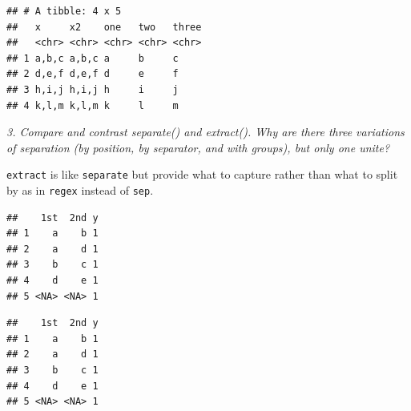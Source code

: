 \documentclass[]{book}
\newenvironment{Shaded}{\begin{snugshade}}{\end{snugshade}}
\newcommand{\DataTypeTok}[1]{\textcolor[rgb]{0.13,0.29,0.53}{#1}}
\newcommand{\DecValTok}[1]{\textcolor[rgb]{0.00,0.00,0.81}{#1}}
\newcommand{\KeywordTok}[1]{\textcolor[rgb]{0.13,0.29,0.53}{\textbf{#1}}}
\newcommand{\NormalTok}[1]{#1}
\newcommand{\OperatorTok}[1]{\textcolor[rgb]{0.81,0.36,0.00}{\textbf{#1}}}
\newcommand{\OtherTok}[1]{\textcolor[rgb]{0.56,0.35,0.01}{#1}}
\newcommand{\StringTok}[1]{\textcolor[rgb]{0.31,0.60,0.02}{#1}}
\theoremstyle{definition}
\theoremstyle{definition}
\theoremstyle{definition}
\theoremstyle{remark}
\begin{document}
\begin{verbatim}
## # A tibble: 4 x 5
##   x     x2    one   two   three
##   <chr> <chr> <chr> <chr> <chr>
## 1 a,b,c a,b,c a     b     c    
## 2 d,e,f d,e,f d     e     f    
## 3 h,i,j h,i,j h     i     j    
## 4 k,l,m k,l,m k     l     m
\end{verbatim}

\emph{3. Compare and contrast separate() and extract(). Why are there
three variations of separation (by position, by separator, and with
groups), but only one unite?}

\texttt{extract} is like \texttt{separate} but provide what to capture
rather than what to split by as in \texttt{regex} instead of
\texttt{sep}.

\begin{Shaded}
\end{Shaded}

\begin{verbatim}
##    1st  2nd y
## 1    a    b 1
## 2    a    d 1
## 3    b    c 1
## 4    d    e 1
## 5 <NA> <NA> 1
\end{verbatim}

\begin{Shaded}
\end{Shaded}

\begin{verbatim}
##    1st  2nd y
## 1    a    b 1
## 2    a    d 1
## 3    b    c 1
## 4    d    e 1
## 5 <NA> <NA> 1
\end{verbatim}
\end{document}
